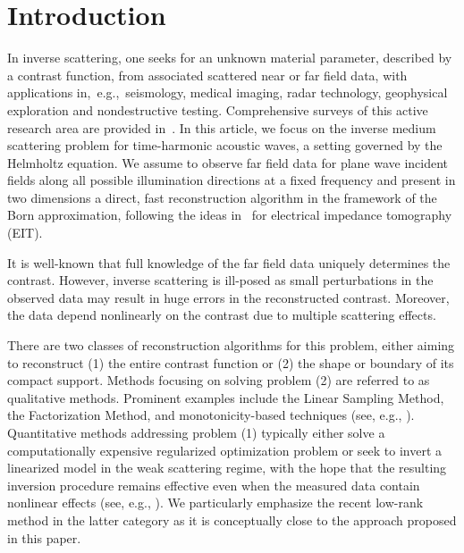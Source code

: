 \documentclass[11pt,a4paper]{article}
\theoremstyle{definition}
\theoremstyle{remark} \newtheorem{remark}[theorem]{Remark}
\numberwithin{equation}{section}
\numberwithin{figure}{section}
\numberwithin{algorithm}{section}
\numberwithin{table}{section}
\begin{document}
\section{Introduction}
\label{sec:Introduction}

In inverse scattering, one seeks for an unknown material parameter, described by a contrast function, from associated scattered near or far field data, with applications in,~e.g.,~seismology, medical imaging, radar technology, geophysical exploration and nondestructive testing.
Comprehensive surveys of this active research area are provided in~\cite{CakColHad23,ColKre19}.
In this article, we focus on the inverse medium scattering problem for time-harmonic acoustic waves, a setting governed by the Helmholtz equation. We assume to observe far field data for plane wave incident fields along all possible illumination directions at a fixed frequency and present in two dimensions a direct, fast reconstruction algorithm in the framework of the Born approximation, following the ideas in~\cite{AutGarHirHvy24,Garde25} for electrical impedance tomography (EIT).

It is well-known that full knowledge of the far field data uniquely determines the contrast.
However, inverse scattering is ill-posed as small perturbations in the observed data may result in huge errors in the reconstructed contrast.
Moreover, the data depend nonlinearly on the contrast due to multiple scattering effects.

There are two classes of reconstruction algorithms for this problem, either aiming to reconstruct (1) the entire contrast function or (2) the shape or boundary of its compact support.
Methods focusing on solving problem (2) are referred to as qualitative methods.
Prominent examples include the Linear Sampling Method, the Factorization Method, and monotonicity-based techniques (see, e.g., \cite{AudHad14,ColKir96,
GriHar18,Kir98,KirGri08}).
Quantitative methods addressing problem (1) typically either solve a computationally expensive regularized optimization problem or seek to invert a linearized model in the weak scattering regime, with the hope that the resulting inversion procedure remains effective even when the measured data contain nonlinear 
effects (see, e.g., \cite{ColMon88,KilMosSch12,
ZhoAudMenZha26}).
We particularly emphasize the recent low-rank method \cite{ZhoAudMenZha26} in the latter category as it is conceptually close to the approach proposed in this paper.
\end{document}
